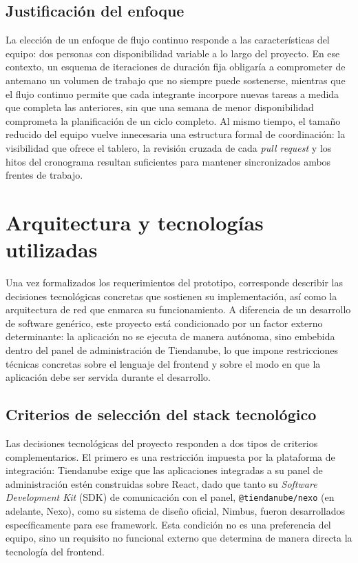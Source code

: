 \subsection{Justificación del enfoque}
\label{sec:justificacion-enfoque}

La elección de un enfoque de flujo continuo responde a las características del equipo: dos personas con disponibilidad variable a lo largo del proyecto. En ese contexto, un esquema de iteraciones de duración fija obligaría a comprometer de antemano un volumen de trabajo que no siempre puede sostenerse, mientras que el flujo continuo permite que cada integrante incorpore nuevas tareas a medida que completa las anteriores, sin que una semana de menor disponibilidad comprometa la planificación de un ciclo completo. Al mismo tiempo, el tamaño reducido del equipo vuelve innecesaria una estructura formal de coordinación: la visibilidad que ofrece el tablero, la revisión cruzada de cada \emph{pull request} y los hitos del cronograma resultan suficientes para mantener sincronizados ambos frentes de trabajo.

\section{Arquitectura y tecnologías utilizadas}
\label{sec:arquitectura-tecnologias}

Una vez formalizados los requerimientos del prototipo, corresponde describir las decisiones tecnológicas concretas que sostienen su implementación, así como la arquitectura de red que enmarca su funcionamiento. A diferencia de un desarrollo de software genérico, este proyecto está condicionado por un factor externo determinante: la aplicación no se ejecuta de manera autónoma, sino embebida dentro del panel de administración de Tiendanube, lo que impone restricciones técnicas concretas sobre el lenguaje del frontend y sobre el modo en que la aplicación debe ser servida durante el desarrollo.

\subsection{Criterios de selección del stack tecnológico}
\label{sec:criterios-seleccion}

Las decisiones tecnológicas del proyecto responden a dos tipos de criterios complementarios. El primero es una restricción impuesta por la plataforma de integración: Tiendanube exige que las aplicaciones integradas a su panel de administración estén construidas sobre React, dado que tanto su \emph{Software Development Kit} (SDK) de comunicación con el panel, \texttt{@tiendanube/nexo} (en adelante, Nexo), como su sistema de diseño oficial, Nimbus, fueron desarrollados específicamente para ese framework. Esta condición no es una preferencia del equipo, sino un requisito no funcional externo que determina de manera directa la tecnología del frontend.

